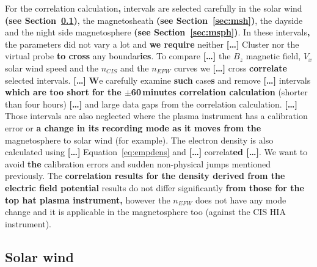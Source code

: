 \documentclass[linenumbers,draft]{agujournal}
\begin{document}
For the correlation calculation\textbf{,} intervals are selected carefully in the solar wind \textbf{(see Section~\ref{sec:sw})}, the magnetosheath \textbf{(see Section~\ref{sec:msh})}, the dayside and the night side magnetosphere \textbf{(see Section~\ref{sec:msph})}. In these intervals\textbf{,} the parameters did not vary a lot and \textbf{we require} neither \textbf{[\dots]} Cluster nor the virtual probe \textbf{to cross} any boundar\textbf{ies}. To compare \textbf{[\dots]} the $B_z$ magnetic field, $V_x$ solar wind speed and the $n_{CIS}$ and the $n_{EFW}$ curves we \textbf{[\dots]} cross \textbf{correlate} selected intervals. \textbf{[\dots]} \textbf{W}e carefully examine \textbf{such} case\textbf{s} and remove \textbf{[\dots]} intervals \textbf{which are too short for the $\pm$60\,minutes correlation calculation} (shorter than four hours) \textbf{[\dots]} and large data gaps from the correlation calculation. \textbf{[\dots]} Those intervals are also neglected where the plasma instrument has a calibration error or \textbf{a change in its recording mode as it moves from the} magnetosphere to solar wind (for example). The electron density is also calculated using \textbf{[\dots]} Equation~\ref{eq:empdens} and \textbf{[\dots]} correlat\textbf{ed [\dots]}. We want to avoid \textbf{the} calibration errors and sudden non-physical jumps mentioned previously. The \textbf{correlation results for the density derived from the electric field potential} results do not differ significantly \textbf{from those for the top hat plasma instrument,} however the $n_{EFW}$ does not have any mode change and it is applicable in the magnetosphere too (against the CIS HIA instrument).

\subsection{Solar wind}
\label{sec:sw}
\end{document}
